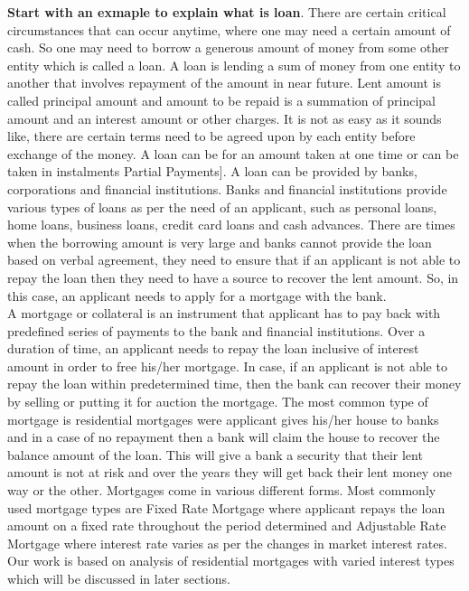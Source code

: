 \textbf{Start with an exmaple to explain what is loan}. There are certain critical circumstances that can occur anytime, where one may need a certain amount of cash. So one may need to borrow a generous amount of money from some other entity which is called a loan. A loan is lending a sum of money from one entity to another that involves repayment of the amount in near future. Lent amount is called principal amount and amount to be repaid is a summation of principal amount and an interest amount or other charges. It is not as easy as it sounds like, there are certain terms need to be agreed upon by each entity before exchange of the money. A loan can be for an amount taken at one time or can be taken in instalments {Partial Payments]. A loan can be provided by banks, corporations and financial institutions. Banks and financial institutions provide various types of loans as per the need of an applicant, such as personal loans, home loans, business loans, credit card loans and cash advances. There are times when the borrowing amount is very large and banks cannot provide the loan based on verbal agreement, they need to ensure that if an applicant is not able to repay the loan then they need to have a source to recover the lent amount. So, in this case, an applicant needs to apply for a mortgage with the bank.\\

A mortgage or collateral is an instrument that applicant has to pay back with predefined series of payments to the bank and financial institutions. Over a duration of time, an applicant needs to repay the loan inclusive of interest amount in order to free his/her mortgage. In case, if an applicant is not able to repay the loan within predetermined time, then the bank can recover their money by selling or putting it for auction the mortgage. The most common type of mortgage is residential mortgages were applicant gives his/her house to banks and in a case of no repayment then a bank will claim the house to recover the balance amount of the loan. This will give a bank a security that their lent amount is not at risk and over the years they will get back their lent money one way or the other. Mortgages come in various different forms. Most commonly used mortgage types are Fixed Rate Mortgage where applicant repays the loan amount on a fixed rate throughout the period determined and Adjustable Rate Mortgage where interest rate varies as per the changes in market interest rates. Our work is based on analysis of residential mortgages with varied interest types which will be discussed in later sections.\\

}

